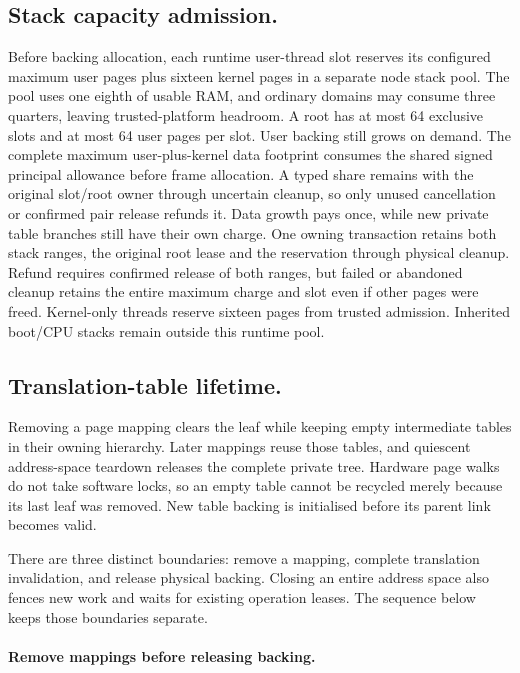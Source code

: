 \subsection{Stack capacity admission.}
Before backing allocation, each runtime user-thread slot reserves its configured
maximum user pages plus sixteen kernel pages in a separate node stack pool.
The pool uses one eighth of usable RAM, and ordinary domains may consume three
quarters, leaving trusted-platform headroom. A root has at most 64 exclusive
slots and at most 64 user pages per slot. User backing still grows on demand.
The complete maximum user-plus-kernel data footprint consumes the shared signed
principal allowance before frame allocation. A typed share remains with the
original slot/root owner through uncertain cleanup, so only unused cancellation or
confirmed pair release refunds it. Data growth pays once, while new private
table branches still have their own charge.
One owning transaction retains both stack ranges, the original root lease and
the reservation through physical cleanup. Refund requires confirmed release of
both ranges, but failed or abandoned cleanup retains the entire maximum charge and
slot even if other pages were freed. Kernel-only threads reserve sixteen pages
from trusted admission. Inherited boot/CPU stacks remain outside this runtime pool.

\subsection{Translation-table lifetime.}

Removing a page mapping clears the leaf while keeping empty intermediate
tables in their owning hierarchy. Later mappings reuse those tables, and
quiescent address-space teardown releases the complete private tree. Hardware
page walks do not take software locks, so an empty table cannot be recycled
merely because its last leaf was removed. New table backing is initialised
before its parent link becomes valid.

There are three distinct boundaries: remove a mapping, complete translation
invalidation, and release physical backing. Closing an entire address space
also fences new work and waits for existing operation leases. The sequence
below keeps those boundaries separate.

\paragraph*{Remove mappings before releasing backing.}

